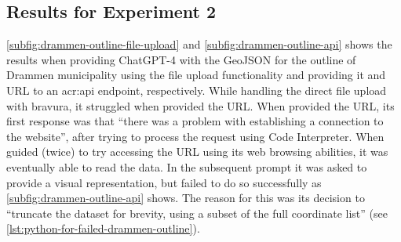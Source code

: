 \subsection{Results for Experiment 2}

\autoref{subfig:drammen-outline-file-upload} and \autoref{subfig:drammen-outline-api} shows the results when providing ChatGPT-4 with the GeoJSON for the outline of Drammen municipality using the file upload functionality and providing it and URL to an \acrshort{acr:api} endpoint, respectively. While handling the direct file upload with bravura, it struggled when provided the URL. When provided the URL, its first response was that \enquote{there was a problem with establishing a connection to the website}, after trying to process the request using Code Interpreter. When guided (twice) to try accessing the URL using its web browsing abilities, it was eventually able to read the data. In the subsequent prompt it was asked to provide a visual representation, but failed to do so successfully as \autoref{subfig:drammen-outline-api} shows. The reason for this was its decision to \enquote{truncate the dataset for brevity, using a subset of the full coordinate list} (see \autoref{lst:python-for-failed-drammen-outline}).

